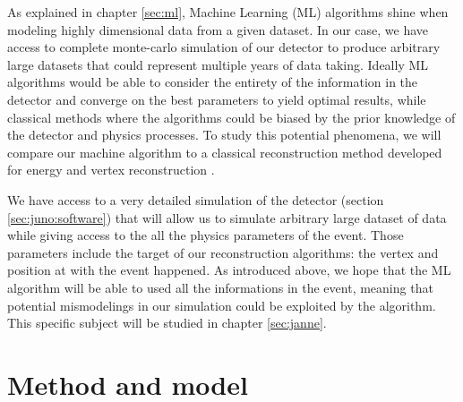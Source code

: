 As explained in chapter \ref{sec:ml}, Machine Learning (ML) algorithms shine when modeling highly dimensional data from a given dataset. In our case, we have access to complete monte-carlo simulation of our detector to produce arbitrary large datasets that could represent multiple years of data taking.
Ideally ML algorithms would be able to consider the entirety of the information in the detector and converge on the best parameters to yield optimal results, while classical methods where the algorithms could be biased by the prior knowledge of the detector and physics processes. To study this potential phenomena, we will compare our machine algorithm to a classical reconstruction method developed for energy and vertex reconstruction \cite{lebrin_towards_2022}.

We have access to a very detailed simulation of the detector (section \ref{sec:juno:software}) that will allow us to simulate arbitrary large dataset of data while giving access to the all the physics parameters of the event. Those parameters include the target of our reconstruction algorithms: the vertex and position at with the event happened. As introduced above, we hope that the ML algorithm will be able to used all the informations in the event, meaning that potential mismodelings in our simulation could be exploited by the algorithm. This specific subject will be studied in chapter \ref{sec:janne}.

\section{Method and model}

